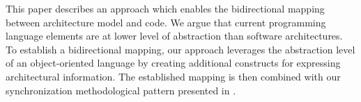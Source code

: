 This paper describes an approach which enables the bidirectional mapping between architecture model and code. %
We argue that current programming language elements are at lower level of abstraction than software architectures.
To establish a bidirectional mapping, our approach leverages the abstraction level of an object-oriented language by creating additional constructs for expressing architectural information.
The established mapping is then combined with our synchronization methodological pattern presented in \cite{foster2016}.





